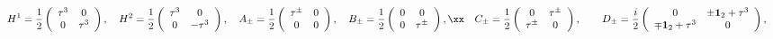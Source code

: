 \documentclass[12pt,epsf]{article}
\begin{document}
\begin{eqnarray} \label{cw-basis}
&& H^{1} = \frac{1}{2} \left(
                                   \begin{array}{cc}
                                     \tau^3 & 0 \\
                                     0 & \tau^3 \\
                                   \end{array}
                                 \right), \quad
 H^{2} = \frac{1}{2} \left(
                                   \begin{array}{cc}
                                     \tau^3 & 0 \\
                                     0 & - \tau^3 \\
                                   \end{array}
                                 \right), \quad
A_\pm =  \frac{1}{2} \left(
                                   \begin{array}{cc}
                                     \tau^\pm & 0 \\
                                     0 & 0 \\
                                   \end{array}
                                 \right),
                                 \quad
B_\pm =  \frac{1}{2} \left(
                                   \begin{array}{cc}
                                     0 & 0 \\
                                     0 & \tau^\pm \\
                                   \end{array}
                                 \right), \xx
&& C_\pm = \frac{1}{2} \left(
                                   \begin{array}{cc}
                                     0 & \tau^\pm \\
                                     \tau^\pm & 0 \\
                                   \end{array}
                                 \right), \qquad
D_\pm = \frac{i}{2} \left(
                                   \begin{array}{cc}
                                     0 & \pm \mathbf{1}_2 + \tau^3 \\
                                     \mp \mathbf{1}_2 + \tau^3 & 0 \\
                                   \end{array}
                                 \right),
\end{eqnarray}
\end{document}
